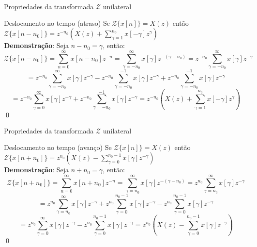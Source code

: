 \begin{frame}{Propriedades da transformada $\mathcal{Z}$ unilateral}
\begin{block}{Deslocamento no tempo (atraso)}
Se $\mathcal{Z}\{x[n]\} = X(z)$ então $\mathcal{Z}\{x[n-n_0]\} = z^{-n_0} \left(X(z) + \sum_{\gamma=1}^{n_0} x[-\gamma] z^{\gamma}  \right)$ \\
\vspace{0.2cm}
\textbf{Demonstração}: Seja $n - n_0 = \gamma$, então:
$$\mathcal{Z}\{x[n-n_0]\} = \sum_{n=0}^{\infty} x[n-n_0] z^{-n} = \sum_{\gamma=-n_0}^{\infty} x[\gamma] z^{-(\gamma + n_0)} = z^{-n_0} \sum_{\gamma=-n_0}^{\infty} x[\gamma] z^{-\gamma}$$
$$= z^{-n_0} \sum_{\gamma=-n_0}^{\infty} x[\gamma] z^{-\gamma} - z^{-n_0} \sum_{\gamma=-n_0}^{-1} x[\gamma] z^{-\gamma} + z^{-n_0} \sum_{\gamma=-n_0}^{-1} x[\gamma] z^{-\gamma}$$
$$= z^{-n_0} \sum_{\gamma=0}^{\infty} x[\gamma] z^{-\gamma} + z^{-n_0} \sum_{\gamma=-n_0}^{-1} x[\gamma] z^{-\gamma} = z^{-n_0} \left(X(z) + \sum_{\gamma=1}^{n_0} x[-\gamma] z^{\gamma}\right)$$\qed
\end{block}
\end{frame}

\begin{frame}{Propriedades da transformada $\mathcal{Z}$ unilateral}
\begin{block}{Deslocamento no tempo (avanço)}
Se $\mathcal{Z}\{x[n]\} = X(z)$ então $\mathcal{Z}\{x[n+n_0]\} = z^{n_0} \left(X(z) - \sum_{\gamma=0}^{n_0-1} x[\gamma] z^{-\gamma}  \right)$ \\
\vspace{0.2cm}
\textbf{Demonstração}: Seja $n + n_0 = \gamma$, então:
$$\mathcal{Z}\{x[n+n_0]\} = \sum_{n=0}^{\infty} x[n+n_0] z^{-n} = \sum_{\gamma=n_0}^{\infty} x[\gamma] z^{-(\gamma - n_0)} = z^{n_0} \sum_{\gamma=n_0}^{\infty} x[\gamma] z^{-\gamma}$$
$$= z^{n_0} \sum_{\gamma=n_0}^{\infty} x[\gamma] z^{-\gamma} + z^{n_0} \sum_{\gamma=0}^{n_0-1} x[\gamma] z^{-\gamma} - z^{n_0} \sum_{\gamma=0}^{n_0-1} x[\gamma] z^{-\gamma}$$
$$= z^{n_0} \sum_{\gamma=0}^{\infty} x[\gamma] z^{-\gamma} - z^{n_0} \sum_{\gamma=0}^{n_0-1} x[\gamma] z^{-\gamma} = z^{n_0} \left(X(z) - \sum_{\gamma=0}^{n_0-1} x[\gamma] z^{-\gamma}\right)$$\qed
\end{block}
\end{frame}



